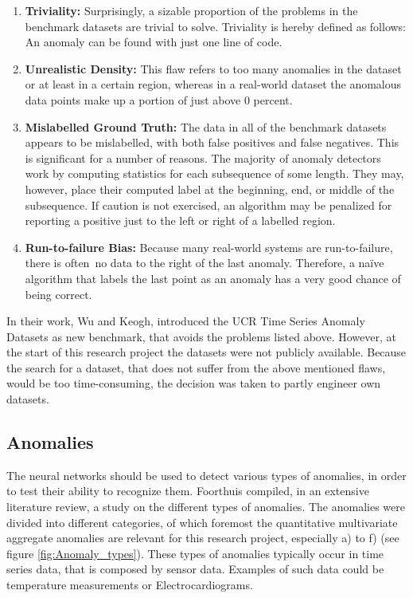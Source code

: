 \begin{enumerate}
	\item \textbf{Triviality:} Surprisingly, a sizable proportion of the problems in the benchmark datasets are trivial to solve. Triviality is hereby defined as follows: An anomaly can be found with just one line of code.
	\item \textbf{Unrealistic Density:} This flaw refers to too many anomalies in the dataset or at least in a certain region, whereas in a real-world dataset the anomalous data points make up a portion of just above 0 percent.   
	\item \textbf{Mislabelled Ground Truth:} The data in all of the benchmark datasets appears to be mislabelled, with both false positives and false negatives. This is significant for a number of reasons. The majority of anomaly detectors work by computing statistics for each subsequence of some length. They may, however, place their computed label at the beginning, end, or middle of the subsequence. If caution is not exercised, an algorithm may be penalized for reporting a positive just to the left or right of a labelled region.
	\item \textbf{Run-to-failure Bias:} Because many real-world systems are run-to-failure, there is often no data to the right of the last anomaly. Therefore, a naïve algorithm that labels the last point as an anomaly has a very good chance of being correct.
\end{enumerate}

In their work, Wu and Keogh, introduced the UCR Time Series Anomaly Datasets as new benchmark, that avoids the problems listed above. However, at the start of this research project the datasets were not publicly available. Because the search for a dataset, that does not suffer from the above mentioned flaws, would be too time-consuming, the decision was taken to partly engineer own datasets.
\newline
\subsection{Anomalies}
The neural networks should be used to detect various types of anomalies, in order to test their ability to recognize them. Foorthuis \parencite*{Foorthuis2021} compiled, in an extensive literature review, a study on the different types of anomalies. The anomalies were divided into different categories, of which foremost the quantitative multivariate aggregate anomalies are relevant for this research project, especially a) to f) (see figure \ref{fig:Anomaly_types}). These types of anomalies typically occur in time series data, that is composed by sensor data. Examples of such data could be temperature measurements or Electrocardiograms.

